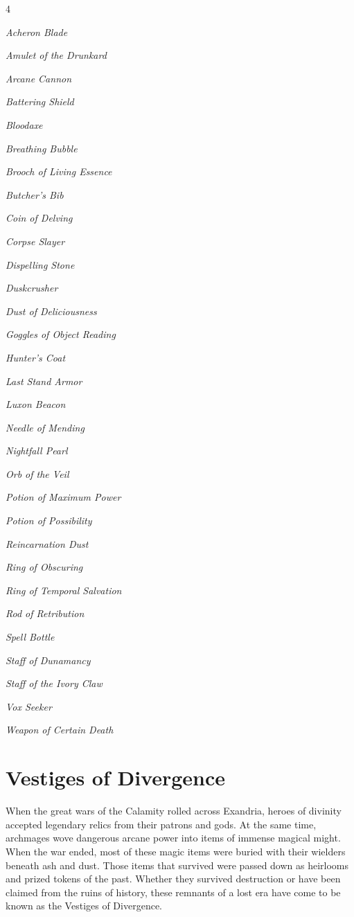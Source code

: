 \documentclass[10pt,a4paper,twoside,bg=print,twocolumn,openany,nodeprecatedcode]{dndbook}
\begin{document}
\begin{itemize}
\begin{multicols}{4}
\item \textit{Acheron Blade}
\item \textit{Amulet of the Drunkard}
\item \textit{Arcane Cannon}
\item \textit{Battering Shield}
\item \textit{Bloodaxe}
\item \textit{Breathing Bubble}
\item \textit{Brooch of Living Essence}
\item \textit{Butcher's Bib}
\item \textit{Coin of Delving}
\item \textit{Corpse Slayer}
\item \textit{Dispelling Stone}
\item \textit{Duskcrusher}
\item \textit{Dust of Deliciousness}
\item \textit{Goggles of Object Reading}
\item \textit{Hunter's Coat}
\item \textit{Last Stand Armor}
\item \textit{Luxon Beacon}
\item \textit{Needle of Mending}
\item \textit{Nightfall Pearl}
\item \textit{Orb of the Veil}
\item \textit{Potion of Maximum Power}
\item \textit{Potion of Possibility}
\item \textit{Reincarnation Dust}
\item \textit{Ring of Obscuring}
\item \textit{Ring of Temporal Salvation}
\item \textit{Rod of Retribution}
\item \textit{Spell Bottle}
\item \textit{Staff of Dunamancy}
\item \textit{Staff of the Ivory Claw}
\item \textit{Vox Seeker}
\item \textit{Weapon of Certain Death}
\end{multicols}

\end{itemize}

\section{Vestiges of Divergence}
When the great wars of the Calamity rolled across Exandria, heroes of divinity accepted legendary relics from their patrons and gods. At the same time, archmages wove dangerous arcane power into items of immense magical might. When the war ended, most of these magic items were buried with their wielders beneath ash and dust. Those items that survived were passed down as heirlooms and prized tokens of the past. Whether they survived destruction or have been claimed from the ruins of history, these remnants of a lost era have come to be known as the Vestiges of Divergence.
\end{document}
